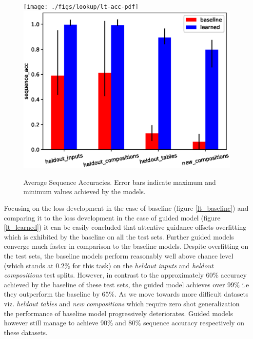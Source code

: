 \begin{figure}[H]
	\begin{minipage}[t]{0.9\textwidth}
		\centering
		\ifpdf
		\texttt{[image: ./figs/lookup/lt-acc-pdf]}
		\else
		\includegraphics[width=\linewidth,keepaspectratio=true]{./figs/lookup/lt-acc-eps}
		\fi
		\caption{\small Average Sequence Accuracies. Error bars indicate maximum and minimum values achieved by the models.}
		\label{res:lt-acc}
	\end{minipage}
\end{figure}

Focusing on the loss development in the case of baseline (figure \ref{lt_baseline}) and comparing it to the loss development in the case of guided model (figure \ref{lt_learned}) it can be easily concluded that attentive guidance offsets overfitting which is exhibited by the baseline on all the test sets. Further guided models converge much faster in comparison to the baseline models. Despite overfitting on the test sets, the baseline models perform reasonably well above chance level (which stands at 0.2\% for this task) on the \textit{heldout inputs} and \textit{heldout compositions} test splits. However, in contrast to the approximately 60\% accuracy achieved by the baseline of these test sets, the guided model achieves over 99\% i.e they outperform the baseline by 65\%. As we move towards more difficult datasets viz. \textit{heldout tables} and \textit{new compositions} which require zero shot generalization the performance of baseline model progressively deteriorates. Guided models however still manage to achieve 90\% and 80\% sequence accuracy respectively on these datasets. 


